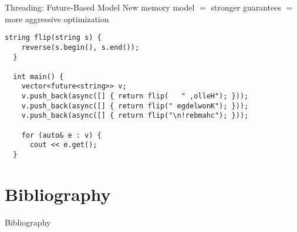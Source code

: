 \documentclass[svgnames,smaller]{beamer}
\newcommand*{\cpp}{\texttt{C++}}
\newcommand*{\csharp}{\texttt{C\#}}
\begin{document}
\begin{frame}[fragile]{Threading: Future-Based Model}
  New memory model \cite{mem-model} $=$ stronger guarantees $=$ more aggressive optimization
  \begin{lstlisting}[title={Taste of \cpp11 \cite{sutter-modern}}]
  string flip(string s) {
    reverse(s.begin(), s.end());
  }

  int main() {
    vector<future<string>> v;
    v.push_back(async([] { return flip(   " ,olleH"); }));
    v.push_back(async([] { return flip(" egdelwonK"); }));
    v.push_back(async([] { return flip("\n!rebmahc"); }));

    for (auto& e : v) {
      cout << e.get();
  }
  \end{lstlisting}
\end{frame}

\section*{Bibliography}
\begin{frame}[allowframebreaks]{Bibliography}
\printbibliography
\end{frame}
\end{document}

